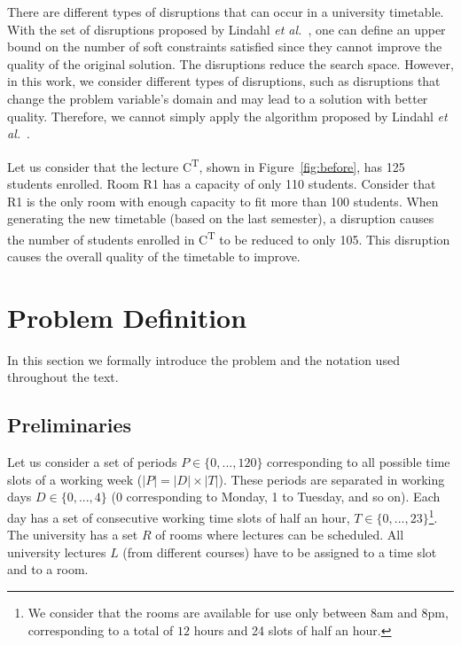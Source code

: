 \documentclass[runningheads]{llncs}
\begin{document}
There are different types of disruptions that can occur in a university timetable. With the set of disruptions proposed by Lindahl \emph{et al.}~\cite{LINDAHL2019}, one can define an upper bound on the number of soft constraints satisfied since they cannot improve the quality of the original solution. The disruptions reduce the search space. However, in this work, we consider different types of disruptions, such as disruptions that change the problem variable's domain and may lead to a solution with better quality. Therefore, we cannot simply apply the algorithm proposed by Lindahl \emph{et al.}~\cite{LINDAHL2019}. %

\begin{example}
Let us consider that the lecture C\textsuperscript{T}, shown in Figure~\ref{fig:before}, has 125 students enrolled. Room R1 has a capacity of only 110 students. Consider that R1 is the only room with enough capacity to fit more than 100 students. When generating the new timetable (based on the last semester), a disruption causes the number of students enrolled in C\textsuperscript{T} to be reduced to only 105. This disruption causes the overall quality of the timetable to improve.
\end{example}


\section{Problem Definition}\label{sec:pro}


In this section we formally introduce the problem and the notation used throughout the text.

\subsection{Preliminaries}

Let us consider a set of periods $P \in \{0,...,120\}$ corresponding to all possible time slots of a working week ($|P| = |D| \times |T|$). These periods are separated in working days $D \in \{0,...,4\}$ (0 corresponding to Monday, 1 to Tuesday, and so on). Each day has a set of consecutive working time slots of half an hour, $T \in \{0,...,23\}$\footnote{We consider that the rooms are available for use only between $8$am and $8$pm, corresponding to a total of $12$ hours and 24 slots of half an hour.}. The university has a set $R$ of rooms where lectures can be scheduled. All university lectures $L$ (from different courses) have to be assigned to a time slot and to a room. 
\end{document}
